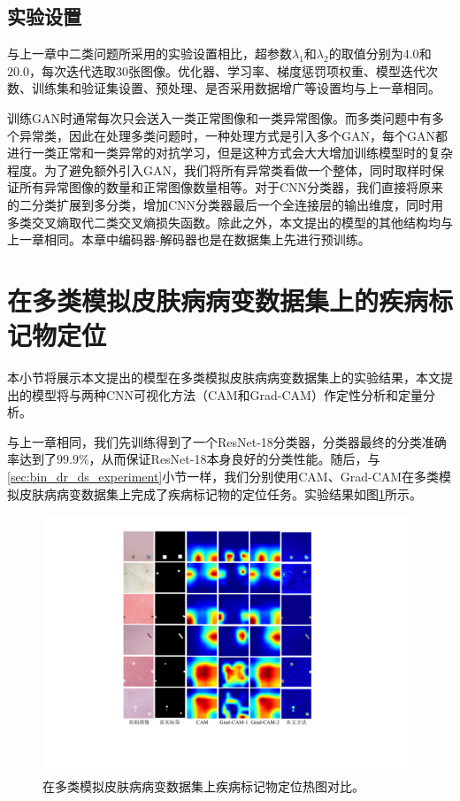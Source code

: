 \subsection{实验设置}\label{sec:multi_classes_experiment_setting}
与上一章中二类问题所采用的实验设置相比，超参数$\lambda_{1}$和$\lambda_{2}$的取值分别为$4.0$和$20.0$，每次迭代选取$30$张图像。优化器、学习率、梯度惩罚项权重、模型迭代次数、训练集和验证集设置、预处理、是否采用数据增广等设置均与上一章相同。

训练GAN时通常每次只会送入一类正常图像和一类异常图像。而多类问题中有多个异常类，因此在处理多类问题时，一种处理方式是引入多个GAN，每个GAN都进行一类正常和一类异常的对抗学习，但是这种方式会大大增加训练模型时的复杂程度。为了避免额外引入GAN，我们将所有异常类看做一个整体，同时取样时保证所有异常图像的数量和正常图像数量相等。对于CNN分类器，我们直接将原来的二分类扩展到多分类，增加CNN分类器最后一个全连接层的输出维度，同时用多类交叉熵取代二类交叉熵损失函数。除此之外，本文提出的模型的其他结构均与上一章相同。本章中编码器-解码器也是在数据集上先进行预训练。
\section{在多类模拟皮肤病病变数据集上的疾病标记物定位}\label{sec:multi_classes_experiments_res}
本小节将展示本文提出的模型在多类模拟皮肤病病变数据集上的实验结果，本文提出的模型将与两种CNN可视化方法（CAM和Grad-CAM）作定性分析和定量分析。

与上一章相同，我们先训练得到了一个ResNet-18分类器，分类器最终的分类准确率达到了$99.9\%$，从而保证ResNet-18本身良好的分类性能。随后，与\ref{sec:bin_dr_ds_experiment}小节一样，我们分别使用CAM、Grad-CAM在多类模拟皮肤病病变数据集上完成了疾病标记物的定位任务。实验结果如图\ref{fig:multi_simulated_skin_res}所示。
\begin{figure}[h]
	\centering
	\includegraphics[width=0.975\textwidth]{figure/multi_simulated_skin_res.pdf}
	\caption[在多类模拟皮肤病病变数据集上疾病标记物定位热图对比]{在多类模拟皮肤病病变数据集上疾病标记物定位热图对比。}
	\label{fig:multi_simulated_skin_res}
\end{figure}


